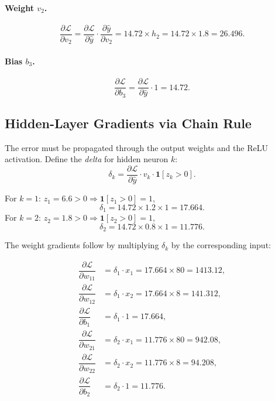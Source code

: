 \documentclass[12pt,a4paper]{article}
\newcommand{\Loss}{\mathcal{L}}
\newcommand{\yhat}{\hat{y}}
\newcommand{\pderiv}[2]{\dfrac{\partial #1}{\partial #2}}
\begin{document}
\paragraph{Weight $v_2$.}
\begin{equation}
  \pderiv{\Loss}{v_2}
    = \pderiv{\Loss}{\yhat}\cdot\pderiv{\yhat}{v_2}
    = 14.72 \times h_2
    = 14.72 \times 1.8 = \mathbf{26.496}.
  \label{eq:grad-v2}
\end{equation}

\paragraph{Bias $b_3$.}
\begin{equation}
  \pderiv{\Loss}{b_3}
    = \pderiv{\Loss}{\yhat}\cdot 1
    = \mathbf{14.72}.
  \label{eq:grad-b3}
\end{equation}

\subsection{Hidden-Layer Gradients via Chain Rule}

The error must be propagated through the output weights and the ReLU
activation.  Define the \emph{delta} for hidden neuron $k$:
\begin{equation}
  \delta_k = \pderiv{\Loss}{\yhat}\cdot v_k \cdot \mathbf{1}[z_k > 0].
  \label{eq:delta-k}
\end{equation}

For $k=1$: $z_1 = 6.6 > 0 \Rightarrow \mathbf{1}[z_1>0]=1$,
\[
  \delta_1 = 14.72 \times 1.2 \times 1 = 17.664.
\]
For $k=2$: $z_2 = 1.8 > 0 \Rightarrow \mathbf{1}[z_2>0]=1$,
\[
  \delta_2 = 14.72 \times 0.8 \times 1 = 11.776.
\]

The weight gradients follow by multiplying $\delta_k$ by the
corresponding input:

\begin{align}
  \pderiv{\Loss}{w_{11}} &= \delta_1 \cdot x_1 = 17.664 \times 80 = \mathbf{1413.12}, \label{eq:grad-w11}\\
  \pderiv{\Loss}{w_{12}} &= \delta_1 \cdot x_2 = 17.664 \times 8  = \mathbf{141.312},  \label{eq:grad-w12}\\
  \pderiv{\Loss}{b_1}    &= \delta_1 \cdot 1   = \mathbf{17.664},                       \label{eq:grad-b1}\\[4pt]
  \pderiv{\Loss}{w_{21}} &= \delta_2 \cdot x_1 = 11.776 \times 80 = \mathbf{942.08},   \label{eq:grad-w21}\\
  \pderiv{\Loss}{w_{22}} &= \delta_2 \cdot x_2 = 11.776 \times 8  = \mathbf{94.208},   \label{eq:grad-w22}\\
  \pderiv{\Loss}{b_2}    &= \delta_2 \cdot 1   = \mathbf{11.776}.                       \label{eq:grad-b2}
\end{align}
\end{document}
